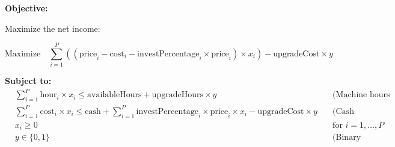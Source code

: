 \documentclass{article}
\begin{document}
\textbf{Objective:}

Maximize the net income:

\[
\text{Maximize} \quad \sum_{i=1}^{P} \left( (\text{price}_i - \text{cost}_i - \text{investPercentage}_i \times \text{price}_i) \times x_i \right) - \text{upgradeCost} \times y
\]

\textbf{Subject to:}
\begin{align*}
& \sum_{i=1}^{P} \text{hour}_i \times x_i \leq \text{availableHours} + \text{upgradeHours} \times y & \quad \text{(Machine hours constraint)} \\
& \sum_{i=1}^{P} \text{cost}_i \times x_i \leq \text{cash} + \sum_{i=1}^{P} \text{investPercentage}_i \times \text{price}_i \times x_i - \text{upgradeCost} \times y & \quad \text{(Cash availability constraint)} \\
& x_i \geq 0 & \quad \text{for } i = 1, \ldots, P \\
& y \in \{0, 1\} & \quad \text{(Binary upgrade decision)}
\end{align*}
\end{document}

